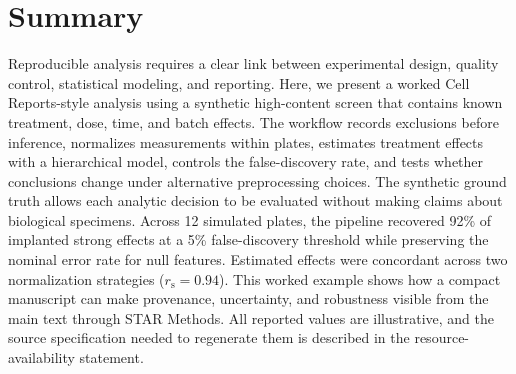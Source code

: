 \section{Summary}
Reproducible analysis requires a clear link between experimental design,
quality control, statistical modeling, and reporting. Here, we present a worked
Cell Reports-style analysis using a synthetic high-content screen that contains
known treatment, dose, time, and batch effects. The workflow records exclusions
before inference, normalizes measurements within plates, estimates treatment
effects with a hierarchical model, controls the false-discovery rate, and tests
whether conclusions change under alternative preprocessing choices. The
synthetic ground truth allows each analytic decision to be evaluated without
making claims about biological specimens. Across 12 simulated plates, the
pipeline recovered 92\% of implanted strong effects at a 5\% false-discovery
threshold while preserving the nominal error rate for null features. Estimated
effects were concordant across two normalization strategies
($r_{\mathrm{s}}=0.94$). This worked example shows how a compact manuscript can
make provenance, uncertainty, and robustness visible from the main text through
STAR Methods. All reported values are illustrative, and the source specification
needed to regenerate them is described in the resource-availability statement.
